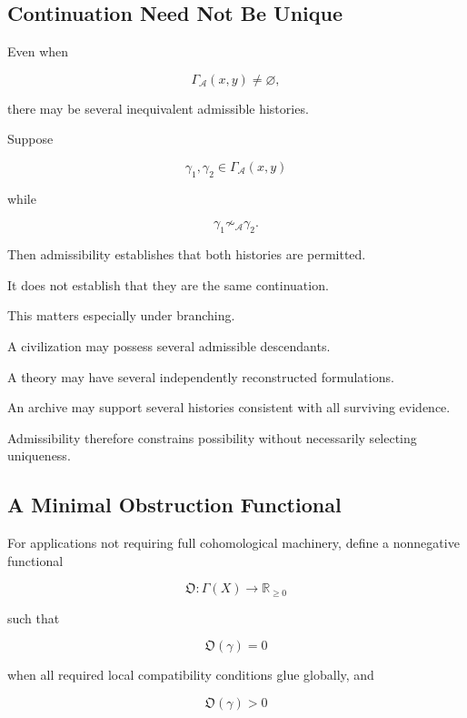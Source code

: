 \documentclass[
  11pt,
  a4paper,
  DIV=12,
  BCOR=0mm,
  parskip=half-
]{scrartcl}
\theoremstyle{definition}
\theoremstyle{plain}
\theoremstyle{remark}
\begin{document}
\subsection{Continuation Need Not Be Unique}
\label{app:multiple-admissible-classes}

Even when

\[
  \Gamma_{\mathcal A}(x,y)\neq\varnothing,
\]

there may be several inequivalent admissible histories.

Suppose

\[
  \gamma_1,\gamma_2
  \in
  \Gamma_{\mathcal A}(x,y)
\]

while

\[
  \gamma_1\not\sim_{\mathcal A}\gamma_2.
\]

Then admissibility establishes that both histories are permitted.

It does not establish that they are the same continuation.

This matters especially under branching.

A civilization may possess several admissible descendants.

A theory may have several independently reconstructed formulations.

An archive may support several histories consistent with all surviving
evidence.

Admissibility therefore constrains possibility without necessarily selecting
uniqueness.


\subsection{A Minimal Obstruction Functional}
\label{app:obstruction-functional}

For applications not requiring full cohomological machinery, define a
nonnegative functional

\[
  \mathfrak O:
  \Gamma(X)\to\mathbb R_{\geq 0}
\]

such that

\[
  \mathfrak O(\gamma)=0
\]

when all required local compatibility conditions glue globally, and

\[
  \mathfrak O(\gamma)>0
\]
\end{document}
